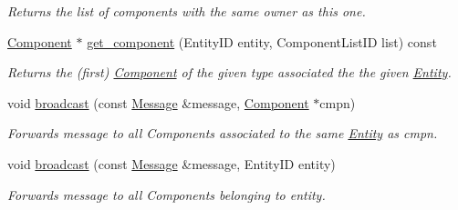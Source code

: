 \begin{DoxyCompactItemize}
\begin{DoxyCompactList}\small\item\em Returns the list of components with the same owner as this one. \end{DoxyCompactList}\item 
\mbox{\label{classnta_1_1ECS_a0a5e6e7ee700a11a048bfaec497f4df4}} 
\hyperlink{classnta_1_1Component}{Component} $\ast$ \hyperlink{classnta_1_1ECS_a0a5e6e7ee700a11a048bfaec497f4df4}{get\+\_\+component} (Entity\+ID entity, Component\+List\+ID list) const
\begin{DoxyCompactList}\small\item\em Returns the (first) \hyperlink{classnta_1_1Component}{Component} of the given type associated the the given \hyperlink{classnta_1_1Entity}{Entity}. \end{DoxyCompactList}\item 
\mbox{\label{classnta_1_1ECS_a997e9fa8509387cdb0f08680b019eb64}} 
void \hyperlink{classnta_1_1ECS_a997e9fa8509387cdb0f08680b019eb64}{broadcast} (const \hyperlink{structnta_1_1Message}{Message} \&message, \hyperlink{classnta_1_1Component}{Component} $\ast$cmpn)
\begin{DoxyCompactList}\small\item\em Forwards message to all Components associated to the same \hyperlink{classnta_1_1Entity}{Entity} as cmpn. \end{DoxyCompactList}\item 
\mbox{\label{classnta_1_1ECS_a3e2dc830c422d943cba4e44612b79c22}} 
void \hyperlink{classnta_1_1ECS_a3e2dc830c422d943cba4e44612b79c22}{broadcast} (const \hyperlink{structnta_1_1Message}{Message} \&message, Entity\+ID entity)
\begin{DoxyCompactList}\small\item\em Forwards message to all Components belonging to entity. \end{DoxyCompactList}\end{DoxyCompactItemize}
